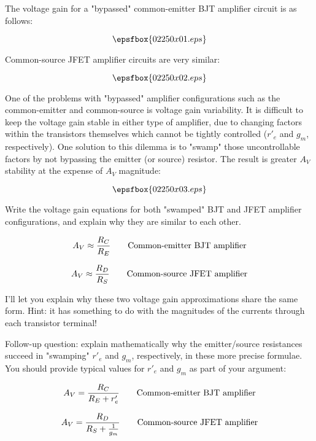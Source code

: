 

The voltage gain for a "bypassed" common-emitter BJT amplifier circuit is as follows:

$$\epsfbox{02250x01.eps}$$

Common-source JFET amplifier circuits are very similar:

$$\epsfbox{02250x02.eps}$$

One of the problems with "bypassed" amplifier configurations such as the common-emitter and common-source is voltage gain variability.  It is difficult to keep the voltage gain stable in either type of amplifier, due to changing factors within the transistors themselves which cannot be tightly controlled ($r'_e$ and $g_m$, respectively).  One solution to this dilemma is to "swamp" those uncontrollable factors by not bypassing the emitter (or source) resistor.  The result is greater $A_V$ stability at the expense of $A_V$ magnitude:

$$\epsfbox{02250x03.eps}$$

Write the voltage gain equations for both "swamped" BJT and JFET amplifier configurations, and explain why they are similar to each other.







$$A_V \approx {R_C \over R_E} \hbox{\hskip 20pt Common-emitter BJT amplifier}$$

$$A_V \approx {R_D \over R_S} \hbox{\hskip 20pt Common-source JFET amplifier}$$

I'll let you explain why these two voltage gain approximations share the same form.  Hint: it has something to do with the magnitudes of the currents through each transistor terminal!

\vskip 10pt

Follow-up question: explain mathematically why the emitter/source resistances succeed in "swamping" $r'_e$ and $g_m$, respectively, in these more precise formulae.  You should provide typical values for $r'_e$ and $g_m$ as part of your argument:

$$A_V = {R_C \over {R_E + r'_e}} \hbox{\hskip 20pt Common-emitter BJT amplifier}$$

$$A_V = {R_D \over {R_S + {1 \over g_m}}} \hbox{\hskip 20pt Common-source JFET amplifier}$$

